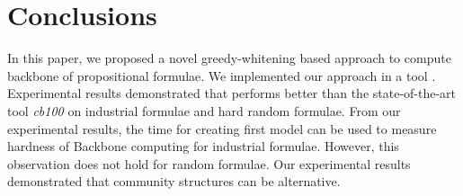 \section{Conclusions}\label{sec:conc}



In this paper, we proposed a novel greedy-whitening based approach \tool to compute backbone of propositional formulae.
We implemented our approach in a tool \tool. Experimental results demonstrated that
\tool performs better than the  state-of-the-art tool \textit{cb100} on industrial formulae and hard random formulae.
From our experimental results, the time for creating first model can be used to measure hardness of Backbone computing for industrial formulae.
However, this observation does not hold for random formulae. Our experimental results demonstrated that community structures can be alternative.


